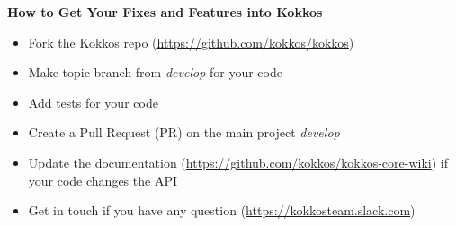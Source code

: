 












\begin{frame}[fragile]

  \vspace{10pt}

  \textbf{How to Get Your Fixes and Features into Kokkos}
  \newline
  \begin{itemize}
    \item Fork the Kokkos repo (\url{https://github.com/kokkos/kokkos})
    \item Make topic branch from \textit{develop} for your code
    \item Add tests for your code
    \item Create a Pull Request (PR) on the main project \textit{develop}
    \item Update the documentation (\url{https://github.com/kokkos/kokkos-core-wiki}) if your code changes the API
    \item Get in touch if you have any question (\url{https://kokkosteam.slack.com})
  \end{itemize}

\end{frame}



